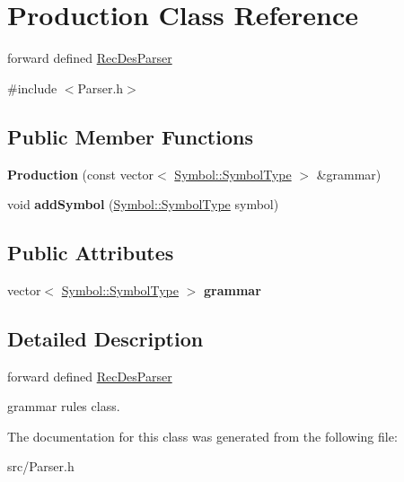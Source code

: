 \hypertarget{class_production}{}\section{Production Class Reference}
\label{class_production}


forward defined \hyperlink{class_rec_des_parser}{Rec\+Des\+Parser}  




{\ttfamily \#include $<$Parser.\+h$>$}

\subsection*{Public Member Functions}
\begin{DoxyCompactItemize}
\item 
\hypertarget{class_production_a8aacdb38e77a1a6804ac153026dd478b}{}\label{class_production_a8aacdb38e77a1a6804ac153026dd478b} 
{\bfseries Production} (const vector$<$ \hyperlink{class_symbol_a7ee37d4cfcb980f4eddf7ed1a028da5a}{Symbol\+::\+Symbol\+Type} $>$ \&grammar)
\item 
\hypertarget{class_production_acd9214af2eafdc574e67b60408931121}{}\label{class_production_acd9214af2eafdc574e67b60408931121} 
void {\bfseries add\+Symbol} (\hyperlink{class_symbol_a7ee37d4cfcb980f4eddf7ed1a028da5a}{Symbol\+::\+Symbol\+Type} symbol)
\end{DoxyCompactItemize}
\subsection*{Public Attributes}
\begin{DoxyCompactItemize}
\item 
\hypertarget{class_production_af1ba973a727cd29d8e650794ca4db609}{}\label{class_production_af1ba973a727cd29d8e650794ca4db609} 
vector$<$ \hyperlink{class_symbol_a7ee37d4cfcb980f4eddf7ed1a028da5a}{Symbol\+::\+Symbol\+Type} $>$ {\bfseries grammar}
\end{DoxyCompactItemize}


\subsection{Detailed Description}
forward defined \hyperlink{class_rec_des_parser}{Rec\+Des\+Parser} 

grammar rules class. 

The documentation for this class was generated from the following file\+:\begin{DoxyCompactItemize}
\item 
src/Parser.\+h\end{DoxyCompactItemize}
